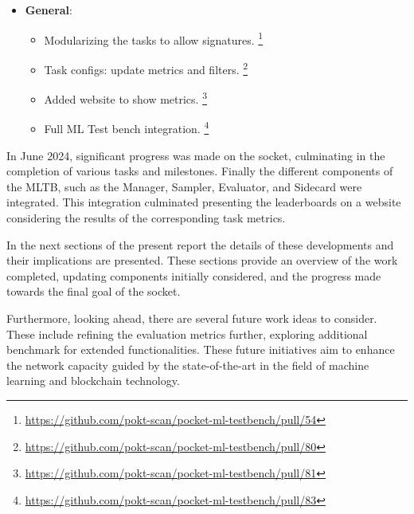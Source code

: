 \begin{itemize}[noitemsep]
\begin{itemize}[noitemsep]
\begin{itemize}[noitemsep]
                \item Added endpoint for tokenizer in llm nodes. \footnote{\url{https://github.com/pokt-scan/pocket-ml-testbench/pull/56}}                
            \end{itemize}
        \item \textbf{General}:
            \begin{itemize}[noitemsep]
                \item Modularizing the tasks to allow signatures. \footnote{\url{https://github.com/pokt-scan/pocket-ml-testbench/pull/54}}
                \item Task configs: update metrics and filters. \footnote{\url{https://github.com/pokt-scan/pocket-ml-testbench/pull/80}}
                \item Added website to show metrics. \footnote{\url{https://github.com/pokt-scan/pocket-ml-testbench/pull/81}}
                \item Full ML Test bench integration. \footnote{\url{https://github.com/pokt-scan/pocket-ml-testbench/pull/83}}            
            \end{itemize}
    \end{itemize}
\end{itemize}

In June 2024, significant progress was made on the socket, culminating in the completion of various tasks and milestones. 
Finally the different components of the \gls{MLTB}, such as the Manager, Sampler, Evaluator, and Sidecard were integrated. 
This integration culminated presenting the leaderboards on a website considering the results of the corresponding task metrics.

In the next sections of the present report the details of these developments and their implications are presented. 
These sections provide an overview of the work completed, updating components initially considered, and the progress made towards the final goal of the socket.

Furthermore, looking ahead, there are several future work ideas to consider. 
These include refining the evaluation metrics further, exploring additional benchmark for extended functionalities. 
These future initiatives aim to enhance the network capacity guided by the state-of-the-art in the field of machine learning and blockchain technology.
